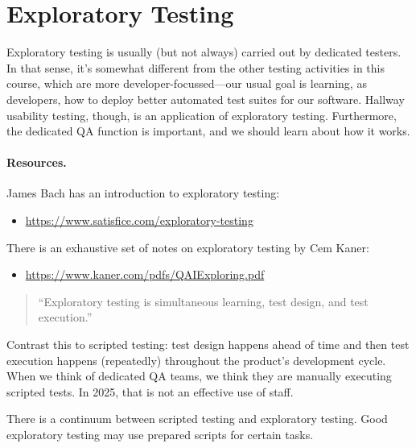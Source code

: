 \documentclass[11pt]{article}
\begin{document}
\section*{Exploratory Testing}
\vspace*{-1em}

Exploratory testing is usually (but not always) carried out by
dedicated testers. In that sense, it's somewhat different from the
other testing activities in this course, which are more
developer-focussed---our usual goal is learning, as developers, how to
deploy better automated test suites for our software. Hallway
usability testing, though, is an application of exploratory testing.
Furthermore, the dedicated QA function is important, and we should
learn about how it works.

\paragraph{Resources.} James Bach has an introduction 
to exploratory testing:\\[-2em]
{\scriptsize
\begin{itemize}[noitemsep]
\item \url{https://www.satisfice.com/exploratory-testing}
\end{itemize}
}
There is an exhaustive set of notes on exploratory testing by Cem Kaner:\\[-2em]
{\scriptsize
\begin{itemize}
\item \url{https://www.kaner.com/pdfs/QAIExploring.pdf}
\end{itemize}
}

\begin{quote}
``Exploratory testing is simultaneous learning, test design, and test execution.''
\end{quote}
Contrast this to scripted testing: test design
happens ahead of time and then test execution happens (repeatedly)
throughout the product's development cycle. When we think of
dedicated QA teams, we think they are manually executing scripted
tests. In 2025, that is not an effective use of staff.

There is a continuum between scripted testing and exploratory testing.
Good exploratory testing may use prepared scripts for certain tasks.
\end{document}
